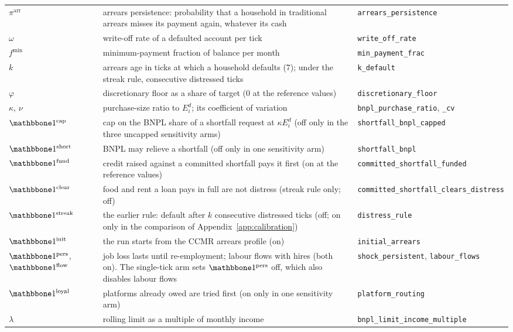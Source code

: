 \begin{longtable}{L{2.4cm}L{7.2cm}H{3.8cm}}
$\pi^{\text{arr}}$ & arrears persistence: probability that a household in traditional arrears misses its payment again, whatever its cash & \texttt{arrears\_persistence} \\
$\omega$ & write-off rate of a defaulted account per tick & \texttt{write\_off\_rate} \\
$f^{\min}$ & minimum-payment fraction of balance per month & \texttt{min\_payment\_frac} \\
$k$ & arrears age in ticks at which a household defaults (7); under the streak rule, consecutive distressed ticks & \texttt{k\_default} \\
$\varphi$ & discretionary floor as a share of target (0 at the reference values) & \texttt{discretionary\_floor} \\
$\kappa$, $\nu$ & purchase-size ratio to $E^d_i$; its coefficient of variation & \texttt{bnpl\_purchase\_ratio}, \texttt{\_cv} \\
$\ind^{\text{cap}}$ & cap on the \ac{BNPL} share of a shortfall request at $\kappa E^d_i$ (off only in the three uncapped sensitivity arms) & \texttt{shortfall\_bnpl\_capped} \\
$\ind^{\text{short}}$ & \ac{BNPL} may relieve a shortfall (off only in one sensitivity arm) & \texttt{shortfall\_bnpl} \\
$\ind^{\text{fund}}$ & credit raised against a committed shortfall pays it first (on at the reference values) & \texttt{committed\_shortfall\_funded} \\
$\ind^{\text{clear}}$ & food and rent a loan pays in full are not distress (streak rule only; off) & \texttt{committed\_shortfall\_clears\_distress} \\
$\ind^{\text{streak}}$ & the earlier rule: default after $k$ consecutive distressed ticks (off; on only in the comparison of Appendix~\ref{app:calibration}) & \texttt{distress\_rule} \\
$\ind^{\text{init}}$ & the run starts from the \ac{CCMR} arrears profile (on) & \texttt{initial\_arrears} \\
$\ind^{\text{pers}}$, $\ind^{\text{flow}}$ & job loss lasts until re-employment; labour flows with hires (both on). The single-tick arm sets $\ind^{\text{pers}}$ off, which also disables labour flows & \texttt{shock\_persistent}, \texttt{labour\_flows} \\
$\ind^{\text{loyal}}$ & platforms already owed are tried first (on only in one sensitivity arm) & \texttt{platform\_routing} \\
$\lambda$ & rolling limit as a multiple of monthly income & \texttt{bnpl\_limit\_income\_multiple} \\

\end{longtable}
